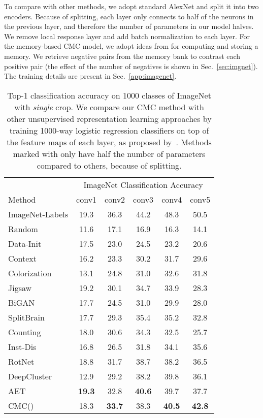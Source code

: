 \documentclass[10pt,twocolumn,letterpaper]{article}
\newcommand{\citep}[1]{\cite{#1}}
\begin{document}
To compare with other methods, we adopt standard AlexNet and split it into two encoders. Because of splitting, each layer only connects to half of the neurons in the previous layer, and therefore the number of parameters in our model halves. We remove local response layer and add batch normalization to each layer. For the memory-based CMC model, we adopt ideas from \cite{wu2018unsupervised} for computing and storing a memory. We retrieve  negative pairs from the memory bank to contrast each positive pair (the effect of the number of negatives is shown in Sec.~\ref{sec:imgnet}). The training details are present in Sec.~\ref{app:imagenet}.

\begin{table}[htp]
\setlength{\tabcolsep}{3.5pt}
\centering
\begin{tabular}{l|ccccc}
& \multicolumn{5}{c}{ImageNet Classification Accuracy} \\
Method  & conv1 & conv2 & conv3 & conv4 & conv5\\
\shline
ImageNet-Labels & 19.3 & 36.3 & 44.2 & 48.3 & 50.5 \\
\hline
Random & 11.6 & 17.1 & 16.9 & 16.3 & 14.1\\
Data-Init~\citep{krahenbuhl2015data} & 17.5 & 23.0 & 24.5 & 23.2 & 20.6\\
\hline
Context~\citep{doersch2015unsupervised} & 16.2 & 23.3 & 30.2 & 31.7 & 29.6 \\
Colorization~\citep{zhang2016colorful} & 13.1 & 24.8 & 31.0 & 32.6 & 31.8\\
Jigsaw~\citep{noroozi2016unsupervised} & 19.2 & 30.1 & 34.7 & 33.9 & 28.3 \\
BiGAN~\citep{donahue2016adversarial} & 17.7 & 24.5 & 31.0 & 29.9 & 28.0 \\
SplitBrain~\citep{zhang2017split} & 17.7 & 29.3 & 35.4 & 35.2 & 32.8\\
Counting~\citep{noroozi2017representation} & 18.0 & 30.6 & 34.3 & 32.5 & 25.7 \\
Inst-Dis~\citep{wu2018unsupervised} & 16.8 & 26.5 & 31.8 & 34.1 & 35.6 \\
RotNet~\citep{gidaris2018unsupervised} & 18.8 & 31.7 & 38.7 & 38.2 & 36.5 \\
DeepCluster~\citep{caron2018deep} & 12.9 & 29.2 & 38.2 & 39.8 & 36.1 \\
AET \citep{zhang2019aet} & \textbf{19.3} & 32.8 & \textbf{40.6} & 39.7 & 37.7 \\
\hline
CMC() & 18.3 & \textbf{33.7} & 38.3 & \textbf{40.5} & \textbf{42.8}\\
\end{tabular}
\caption{\small
Top-1 classification accuracy on 1000 classes of ImageNet \cite{deng2009imagenet} with \emph{single} crop. We compare
our CMC method with other unsupervised representation learning approaches by training 1000-way logistic regression classifiers on top of the feature maps of each layer, as proposed by~\cite{zhang2016colorful}. Methods marked with  only have half the number of parameters compared to others, because of splitting. 
}
\label{exp:cls_imagenet}
\end{table} 
\end{document}
